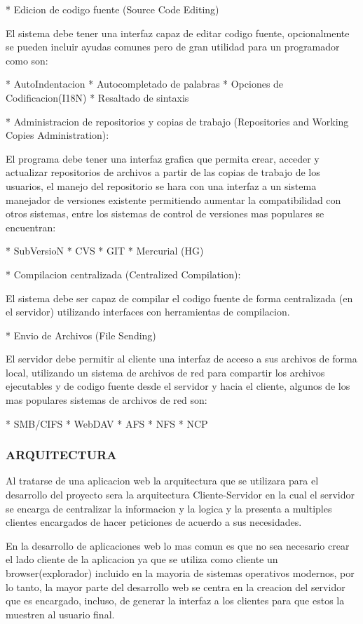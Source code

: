 * Edicion de codigo fuente (Source Code Editing)

El sistema debe tener una interfaz capaz de editar codigo fuente, opcionalmente se pueden incluir ayudas comunes pero de gran utilidad para un programador como son:

* AutoIndentacion
* Autocompletado de palabras
* Opciones de Codificacion(I18N)
* Resaltado de sintaxis


* Administracion de repositorios y copias de trabajo (Repositories and Working Copies Administration):

El programa debe tener una interfaz grafica que permita crear, acceder y actualizar repositorios de archivos a partir de las copias de trabajo de los usuarios, el manejo del repositorio se hara con una interfaz a un sistema manejador de versiones existente permitiendo aumentar la compatibilidad con otros sistemas, entre los sistemas de control de versiones mas populares se encuentran:

* SubVersioN
* CVS
* GIT
* Mercurial (HG)


* Compilacion centralizada (Centralized Compilation):

El sistema debe ser capaz de compilar el codigo fuente de forma centralizada (en el servidor) utilizando interfaces con herramientas de compilacion.

* Envio de Archivos (File Sending)

El servidor debe permitir al cliente una interfaz de acceso a sus archivos de forma local, utilizando un sistema de archivos de red para compartir los archivos ejecutables y de codigo fuente desde el servidor y hacia el cliente, algunos de los mas populares sistemas de archivos de red son:

* SMB/CIFS
* WebDAV
* AFS
* NFS
* NCP



\subsubsection{ARQUITECTURA}

Al tratarse de una aplicacion web la arquitectura que se utilizara para el desarrollo del proyecto sera la arquitectura Cliente-Servidor en la cual el servidor se encarga de centralizar la informacion y la logica y la presenta a multiples clientes encargados de hacer peticiones de acuerdo a sus necesidades.

En la desarrollo de aplicaciones web lo mas comun es que no sea necesario crear el lado cliente de la aplicacion ya que se utiliza como cliente un browser(explorador) incluido en la mayoria de sistemas operativos modernos, por lo tanto, la mayor parte del desarrollo web se centra en la creacion del servidor que es encargado, incluso, de generar la interfaz a los clientes para que estos la muestren al usuario final.


